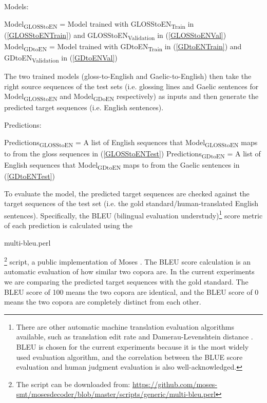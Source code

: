 \documentclass[a4paper]{article}
\begin{document}
\begin{exe}
\ex Models: 
	\begin{xlist}
	\ex \label{ModelGlossToEN} Model\textsubscript{GLOSStoEN} = Model trained with GLOSStoEN\textsubscript{Train} in (\ref{GLOSStoENTrain}) and GLOSStoEN\textsubscript{Validation} in (\ref{GLOSStoENVal})
	\ex \label{ModelGDToEN}Model\textsubscript{GDtoEN} = Model trained with GDtoEN\textsubscript{Train} in (\ref{GDtoENTrain}) and GDtoEN\textsubscript{Validation} in (\ref{GDtoENVal}) 
	\end{xlist}	
\end{exe}
The two trained models (gloss-to-English and Gaelic-to-English) then take the right source sequences of the test sets (i.e. glossing lines and Gaelic sentences for Model\textsubscript{GLOSStoEN} and Model\textsubscript{GDoEN} respectively) as inputs and then generate the predicted target sequences (i.e. English sentences). 

\begin{exe}
\ex Predictions: 
	\begin{xlist}
	\ex Predictions\textsubscript{GLOSStoEN} = A list of English sequences that Model\textsubscript{GLOSStoEN} maps to from the gloss sequences in (\ref{GLOSStoENTest}) 
	\ex Predictions\textsubscript{GDtoEN} = A list of English sequences that Model\textsubscript{GDtoEN} maps to from the Gaelic sentences in (\ref{GDtoENTest}) 
	\end{xlist}	
\end{exe}

To evaluate the model, the predicted target sequences are checked against the target sequences of the test set (i.e. the gold standard/human-translated English sentences). 
Specifically, the BLEU (bilingual evaluation understudy)\footnote{There are other automatic machine translation evaluation algorithms available, such as translation edit rate \citep{Snover06astudy} and Damerau-Levenshtein distance \citep{damerau1964technique, levenshtein1966binary}. BLEU is chosen for the current experiments because it is the most widely used evaluation algorithm, and the correlation between the BLUE score evaluation and human judgment evaluation is also well-acknowledged.} score metric \citep{bleu} of each prediction is calculated using the \begin{myfont} multi-bleu.perl\end{myfont}\footnote{The script can be downloaded from: \url{https://github.com/moses-smt/mosesdecoder/blob/master/scripts/generic/multi-bleu.perl}} 
script, a public implementation of Moses \citep{moses}. The BLEU score calculation is an automatic evaluation of how similar two copora are. In the current experiments we are comparing the predicted target sequences with the gold standard. The BLEU score of 100 means the two copora are identical, and the BLEU score of 0 means the two copora are completely distinct from each other.
\end{document}
